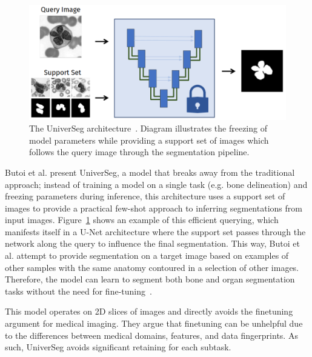 \documentclass[11pt,twoside]{report}
\begin{document}
\begin{figure}[H]
  \centering
  \includegraphics[width=.5\linewidth]{../figures/universeg.png}
  \caption{The UniverSeg architecture~\cite{universeg}. Diagram illustrates the freezing of model parameters while providing a support set of images which follows the query image through the segmentation pipeline.}\label{fig:universeg}
\end{figure}

Butoi et al. present UniverSeg, a model that breaks away from the traditional approach; instead of training a model on a single task (e.g. bone delineation) and freezing parameters during inference, this architecture uses a support set of images to provide a practical few-shot approach to inferring segmentations from input images. Figure~\ref{fig:universeg} shows an example of this efficient querying, which manifests itself in a U-Net architecture where the support set passes through the network along the query to influence the final segmentation. This way, Butoi et al. attempt to provide segmentation on a target image based on examples of other samples with the same anatomy contoured in a selection of other images. Therefore, the model can learn to segment both bone and organ segmentation tasks without the need for fine-tuning~\cite{universeg}.

This model operates on 2D slices of images and directly avoids the finetuning argument for medical imaging. They argue that finetuning can be unhelpful due to the differences between medical domains, features, and data fingerprints. As such, UniverSeg avoids significant retaining for each subtask.



\end{document}
